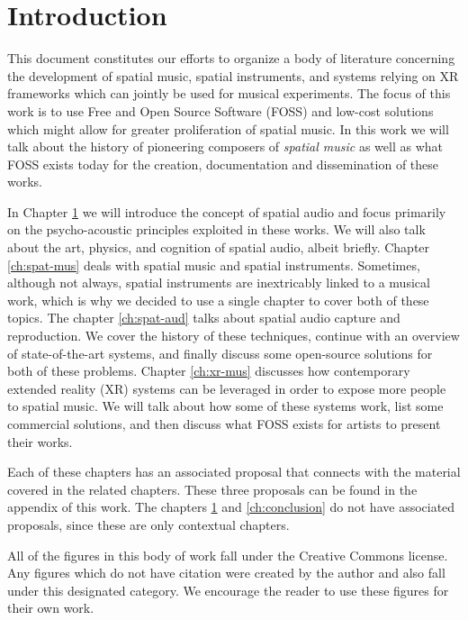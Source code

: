 \chapter{Introduction} \label{ch:intro}

This document constitutes our efforts to organize a body of literature concerning the development of spatial music, spatial instruments, and systems relying on XR frameworks which can jointly be used for musical experiments. The focus of this work is to use Free and Open Source Software (FOSS) and low-cost solutions which might allow for greater proliferation of spatial music. In this work we will talk about the history of pioneering composers of \textit{spatial music} as well as what FOSS exists today for the creation, documentation and dissemination of these works.

In Chapter \ref{ch:intro} we will introduce the concept of spatial audio and focus primarily on the psycho-acoustic principles exploited in these works. We will also talk about the art, physics, and cognition of spatial audio, albeit briefly. Chapter \ref{ch:spat-mus} deals with spatial music and spatial instruments. Sometimes, although not always, spatial instruments are inextricably linked to a musical work, which is why we decided to use a single chapter to cover both of these topics. The chapter \ref{ch:spat-aud} talks about spatial audio capture and reproduction. We cover the history of these techniques, continue with an overview of state-of-the-art systems, and finally discuss some open-source solutions for both of these problems. Chapter \ref{ch:xr-mus} discusses how contemporary extended reality (XR) systems can be leveraged in order to expose more people to spatial music. We will talk about how some of these systems work, list some commercial solutions, and then discuss what FOSS exists for artists to present their works.

Each of these chapters has an associated proposal that connects with the material covered in the related chapters. These three proposals can be found in the appendix of this work. The chapters \ref{ch:intro} and  \ref{ch:conclusion} do not have associated proposals, since these are only contextual chapters. 

All of the figures in this body of work fall under the Creative Commons license. Any figures which do not have citation were created by the author and also fall under this designated category. We encourage the reader to use these figures for their own work. 


